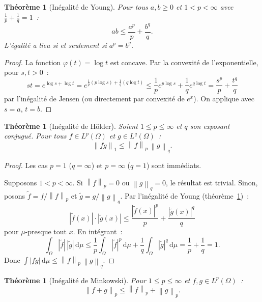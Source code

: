 \documentclass[a4paper,12pt]{book}
\newcommand{\dd}{\mathrm{d}}
\newcommand{\norm}[1]{\left\| #1 \right\|}
\newcommand{\abs}[1]{\left| #1 \right|}
\theoremstyle{definition}
\theoremstyle{plain}
\newtheorem{theoreme}[definition]{Théorème}
\theoremstyle{remark}
\begin{document}
\begin{theoreme}[Inégalité de Young]
\label{thm:young-ineq}
Pour tous $a, b \ge 0$ et $1 < p < \infty$ avec $\frac{1}{p} + \frac{1}{q} = 1$~:
\[
  ab \le \frac{a^p}{p} + \frac{b^q}{q}.
\]
L'égalité a lieu si et seulement si $a^p = b^q$.
\end{theoreme}

\begin{proof}
La fonction $\varphi(t) = \log t$ est concave. Par la convexité de l'exponentielle, pour
$s, t > 0$~:
\[
  st = e^{\log s + \log t} = e^{\frac{1}{p}(p\log s) + \frac{1}{q}(q\log t)}
    \le \frac{1}{p}e^{p\log s} + \frac{1}{q}e^{q\log t} = \frac{s^p}{p} + \frac{t^q}{q}
\]
par l'inégalité de Jensen (ou directement par convexité de
$e^x$). On applique avec $s = a$, $t = b$.
\end{proof}

\begin{theoreme}[Inégalité de Hölder]
\label{thm:holder}
Soient $1 \le p \le \infty$ et $q$ son exposant conjugué. Pour tous
$f \in L^p(\Omega)$ et $g \in L^q(\Omega)$~:
\[
  \norm{fg}_1 \le \norm{f}_p \, \norm{g}_q.
\]
\end{theoreme}

\begin{proof}
Les cas $p = 1$ ($q = \infty$) et $p = \infty$ ($q = 1$) sont immédiats.

Supposons $1 < p < \infty$. Si $\norm{f}_p = 0$ ou $\norm{g}_q = 0$, le résultat est
trivial. Sinon, posons $\tilde f = f/\norm{f}_p$ et $\tilde g = g/\norm{g}_q$. Par
l'inégalité de Young (théorème~\ref{thm:young-ineq})~:
\[
  \abs{\tilde f(x)} \cdot \abs{\tilde g(x)}
    \le \frac{\abs{\tilde f(x)}^p}{p} + \frac{\abs{\tilde g(x)}^q}{q}
\]
pour $\mu$-presque tout $x$. En intégrant~:
\[
  \int_\Omega \abs{\tilde f}\,\abs{\tilde g}\,\dd\mu
    \le \frac{1}{p}\int_\Omega \abs{\tilde f}^p\,\dd\mu
      + \frac{1}{q}\int_\Omega \abs{\tilde g}^q\,\dd\mu
    = \frac{1}{p} + \frac{1}{q} = 1.
\]
Donc $\int \abs{fg}\,\dd\mu \le \norm{f}_p\,\norm{g}_q$.
\end{proof}

\begin{theoreme}[Inégalité de Minkowski]
\label{thm:minkowski}
Pour $1 \le p \le \infty$ et $f, g \in L^p(\Omega)$~:
\[
  \norm{f + g}_p \le \norm{f}_p + \norm{g}_p.
\]
\end{theoreme}
\end{document}
